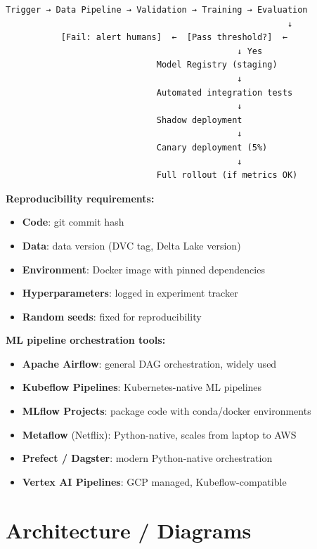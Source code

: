 \documentclass[11pt]{article}
\providecommand{\tightlist}{\setlength{\itemsep}{1pt}\setlength{\parskip}{0pt}}
\begin{document}
\setcodelang{}

\begin{verbatim}
Trigger → Data Pipeline → Validation → Training → Evaluation
                                                        ↓
           [Fail: alert humans]  ←  [Pass threshold?]  ←
                                              ↓ Yes
                              Model Registry (staging)
                                              ↓
                              Automated integration tests
                                              ↓
                              Shadow deployment
                                              ↓
                              Canary deployment (5%)
                                              ↓
                              Full rollout (if metrics OK)
\end{verbatim}

\textbf{Reproducibility requirements:}

\begin{itemize}
\tightlist
\item
  \textbf{Code}: git commit hash
\item
  \textbf{Data}: data version (DVC tag, Delta Lake version)
\item
  \textbf{Environment}: Docker image with pinned dependencies
\item
  \textbf{Hyperparameters}: logged in experiment tracker
\item
  \textbf{Random seeds}: fixed for reproducibility
\end{itemize}

\textbf{ML pipeline orchestration tools:}

\begin{itemize}
\tightlist
\item
  \textbf{Apache Airflow}: general DAG orchestration, widely used
\item
  \textbf{Kubeflow Pipelines}: Kubernetes-native ML pipelines
\item
  \textbf{MLflow Projects}: package code with conda/docker environments
\item
  \textbf{Metaflow} (Netflix): Python-native, scales from laptop to AWS
\item
  \textbf{Prefect / Dagster}: modern Python-native orchestration
\item
  \textbf{Vertex AI Pipelines}: GCP managed, Kubeflow-compatible
\end{itemize}

\section{Architecture / Diagrams}\label{architecture--diagrams}
\end{document}
